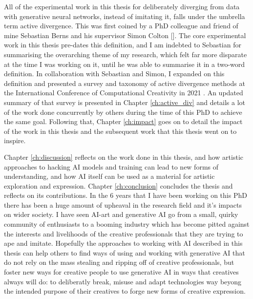 All of the experimental work in this thesis for deliberately diverging from data with generative neural networks, instead of imitating it, falls under the umbrella term active divergence. 
This was first coined by a PhD colleague and friend of mine Sebastian Berns and his supervisor Simon Colton [\citeyear{berns2020bridging}]. 
The core experimental work in this thesis pre-dates this definition, and I am indebted to Sebastian for summarising the overarching theme of my research, which felt far more disparate at the time I was working on it, until he was able to summarise it in a two-word definition. 
In collaboration with Sebastian and Simon, I expanded on this definition and presented a survey and taxonomy of active divergence methods at the International Conference of Computational Creativity in 2021 \citep{broad2021active}.
An updated summary of that survey is presented in Chapter \ref{ch:active_div} and details a lot of the work done concurrently by others during the time of this PhD to achieve the same goal. 
Following that, Chapter \ref{ch:impact} goes on to detail the impact of the work in this thesis and the subsequent work that this thesis went on to inspire. 

Chapter \ref{ch:discussion} reflects on the work done in this thesis, and how artistic approaches to hacking AI models and training can lead to new forms of understanding, and how AI itself can be used as a material for artistic exploration and expression.
Chapter \ref{ch:conclusion} concludes the thesis and reflects on its contributions. 
In the 6 years that I have been working on this PhD there has been a huge amount of upheaval in the research field and it's impacts on wider society. 
I have seen AI-art and generative AI go from a small, quirky community of enthusiasts to a booming industry which has become pitted against the interests and livelihoods of the creative professionals that they are trying to ape and imitate.
Hopefully the approaches to working with AI described in this thesis can help others to find ways of using and working with generative AI that do not rely on the mass stealing and ripping off of creative professionals, but foster new ways for creative people to use generative AI in ways that creatives always will do: to deliberatly break, misuse and adapt technologies way beyong the intended purpose of their creatives to forge new forms of creative expression. 
